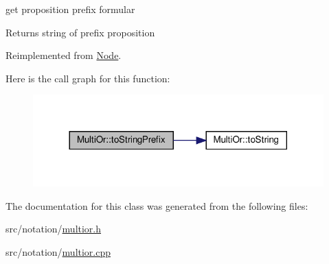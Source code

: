 get proposition prefix formular 

\begin{DoxyReturn}{Returns}
string of prefix proposition 
\end{DoxyReturn}


Reimplemented from \hyperlink{class_node_a815b062345cf2bb42717bd16dc99ea27}{Node}.

Here is the call graph for this function\+:\nopagebreak
\begin{figure}[H]
\begin{center}
\leavevmode
\includegraphics[width=317pt]{dd/d61/class_multi_or_a80405614a8a8db0992c35a70f36aa025_cgraph}
\end{center}
\end{figure}


The documentation for this class was generated from the following files\+:\begin{DoxyCompactItemize}
\item 
src/notation/\hyperlink{multior_8h}{multior.\+h}\item 
src/notation/\hyperlink{multior_8cpp}{multior.\+cpp}\end{DoxyCompactItemize}

